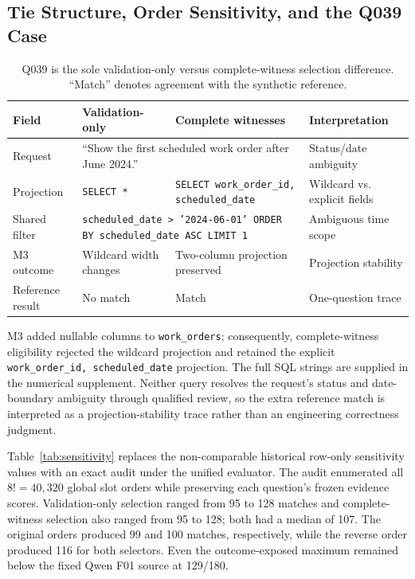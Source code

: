 \documentclass[information,article,submit,moreauthors]{Definitions/mdpi}
\begin{document}
\subsection{Tie Structure, Order Sensitivity, and the Q039 Case}

\begin{table}[htbp]
\caption{Q039 is the sole validation-only versus complete-witness selection difference. ``Match'' denotes agreement with the synthetic reference.}
\label{tab:q039}
\centering
\footnotesize
\setlength{\tabcolsep}{3pt}
\begin{tabular}{p{2.2cm}p{4.0cm}p{4.0cm}p{1.8cm}}
\toprule
Field & Validation-only & Complete witnesses & Interpretation\\
\midrule
Request & \multicolumn{2}{p{8.8cm}}{``Show the first scheduled work order after June 2024.''} & Status/date ambiguity\\
Projection & \texttt{SELECT *} & \texttt{SELECT work\_order\_id, scheduled\_date} & Wildcard vs. explicit fields\\
Shared filter & \multicolumn{2}{p{8.8cm}}{\texttt{scheduled\_date > '2024-06-01' ORDER BY scheduled\_date ASC LIMIT 1}} & Ambiguous time scope\\
M3 outcome & Wildcard width changes & Two-column projection preserved & Projection stability\\
Reference result & No match & Match & One-question trace\\
\bottomrule
\end{tabular}
\end{table}

M3 added nullable columns to \texttt{work\_orders}; consequently, complete-witness eligibility rejected the wildcard projection and retained the explicit \texttt{work\_order\_id, scheduled\_date} projection. The full SQL strings are supplied in the numerical supplement. Neither query resolves the request's status and date-boundary ambiguity through qualified review, so the extra reference match is interpreted as a projection-stability trace rather than an engineering correctness judgment.

Table~\ref{tab:sensitivity} replaces the non-comparable historical row-only sensitivity values with an exact audit under the unified evaluator. The audit enumerated all $8!=40{,}320$ global slot orders while preserving each question's frozen evidence scores. Validation-only selection ranged from 95 to 128 matches and complete-witness selection also ranged from 95 to 128; both had a median of 107. The original orders produced 99 and 100 matches, respectively, while the reverse order produced 116 for both selectors. Even the outcome-exposed maximum remained below the fixed Qwen F01 source at 129/180.
\end{document}
